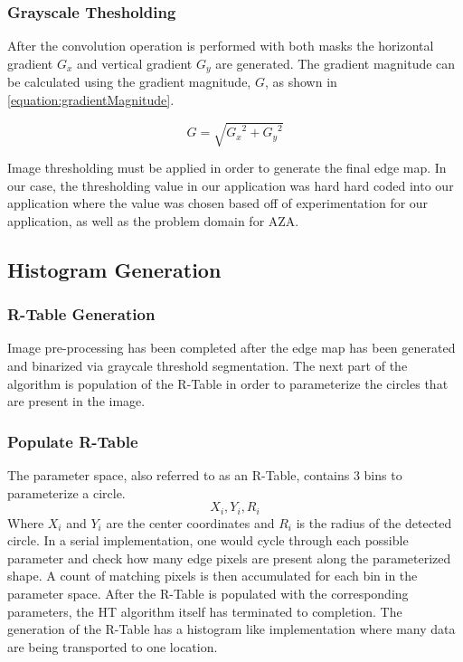 \documentclass[conference]{IEEEtran}
\begin{document}
\subsubsection{Grayscale Thesholding}
After the convolution operation is performed with both masks the horizontal gradient $G_x$ and vertical gradient $G_y$ are generated. 
The gradient magnitude can be calculated using the gradient magnitude, $G$, as shown in \autoref{equation:gradientMagnitude}.

\begin{equation}
  G = \sqrt{{G_x}^2 + {G_y}^2}\label{equation:gradientMagnitude}
\end{equation}

Image thresholding must be applied in order to generate the final edge map.
In our case, the thresholding value in our application was hard hard coded into our application where the value was chosen based off of experimentation for our application, as well as the problem domain for AZA.


\subsection{Histogram Generation}
\subsubsection{R-Table Generation}
Image pre-processing has been completed after the edge map has been generated and binarized via graycale threshold segmentation.
The next part of the algorithm is population of the R-Table in order to parameterize the circles that are present in the image.
\subsubsection{Populate R-Table}
The parameter space, also referred to as an R-Table, contains 3 bins to parameterize a circle.
\begin{equation}
  X_{i}, Y_{i}, R_{i}\label{circle-parameters}
\end{equation}
Where $X_i$ and $Y_i$ are the center coordinates and $R_i$ is the radius of the detected circle.
In a serial implementation, one would cycle through each possible parameter and check how many edge pixels are present along the parameterized shape. 
A count of matching pixels is then accumulated for each bin in the parameter space.
After the R-Table is populated with the corresponding parameters, the HT algorithm itself has terminated to completion.
The generation of the R-Table has a histogram like implementation where many data are being transported to one location.
\end{document}
